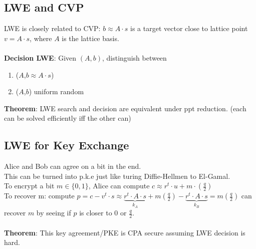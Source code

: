 \documentclass{scribe}
\begin{document}
\subsection{LWE and CVP}
LWE is closely related to CVP: $b \approx A \cdot s$ is a target vector close to lattice point $v = A \cdot s$, where $A$ is the lattice basis.
\\\\
\textbf{Decision LWE}: Given $(A,b)$, distinguish between
\begin{enumerate}
    \item ($A$,$b \approx A \cdot s$)
    \item ($A$,$b$) uniform random
\end{enumerate}
\vspace{5mm}
\textbf{Theorem}: LWE search and decision are equivalent under ppt reduction. (each can be solved efficiently iff the other can)
\vspace{10mm}
\subsection{LWE for Key Exchange}
Alice and Bob can agree on a bit in the end.
\\
This can be turned into p.k.e just like turing Diffie-Hellmen to El-Gamal.
\\
To encrypt a bit $m \in \{0,1\}$, Alice can compute $c \approx r^t \cdot u + m \cdot (\frac{q}{2})$
\\
To recover m: compute $p = c - v^t \cdot s \approx \underbrace{r^t \cdot A \cdot s}_{k_A}+m(\frac{q}{2}) - \underbrace{r^t \cdot A \cdot s}_{k_B} = m(\frac{q}{2})$
can recover $m$ by seeing if $p$ is closer to $0$ or $\frac{q}{2}$.
\\\\
\textbf{Theorem}: This key agreement/PKE is CPA secure assuming LWE decision is hard.






%

\end{document}
